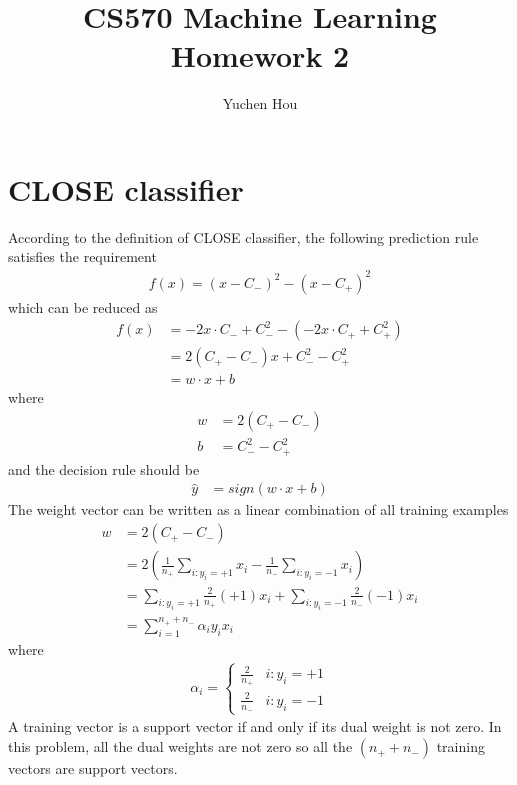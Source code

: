 \documentclass[12pt]{article}
\begin{document}
\title{CS570 Machine Learning Homework 2}
\author{Yuchen Hou}
\maketitle

\section{CLOSE classifier}
According to the definition of CLOSE classifier, the following prediction rule satisfies the requirement
\begin{align}
  f(x) = (x - C_-)^2 - (x - C_+)^2
\end{align}
which can be reduced as
\begin{align}
  f(x) &= -2x \cdot C_- + C_-^2 - (-2x \cdot C_+ + C_+^2) \\
  &=  2 (C_+ - C_-) x + C_-^2 - C_+^2 \\
  &=  w \cdot x + b
\end{align}
where
\begin{align}
  w &=  2 (C_+ - C_-) \\
  b &=  C_-^2 - C_+^2 
\end{align}
and the decision rule should be
\begin{align}
  \hat{y} &= sign(w \cdot x + b)
\end{align}
The weight vector can be written as a linear combination of all training examples
\begin{align}
  w &=  2 (C_+ - C_-) \\
  &= 2 (\frac{1}{n_+}\sum_{i:y_i=+1}x_i - \frac{1}{n_-}\sum_{i:y_i=-1}x_i) \\
  &= \sum_{i:y_i=+1} \frac{2}{n_+} (+1) x_i + \sum_{i:y_i=-1} \frac{2}{n_-} (-1) x_i \\
  &= \sum_{i=1}^{n_+ + n_-} \alpha_i y_i x_i
\end{align}
where
\begin{align}
  \alpha_i =
  \begin{cases}
    \frac{2}{n_+} & i:y_i=+1 \\
    \frac{2}{n_-} & i:y_i=-1
  \end{cases}
\end{align}
A training vector is a support vector if and only if its dual weight is not zero. In this problem, all the dual weights are not zero so all the $(n_+ + n_-)$ training vectors are support vectors.
\end{document}
